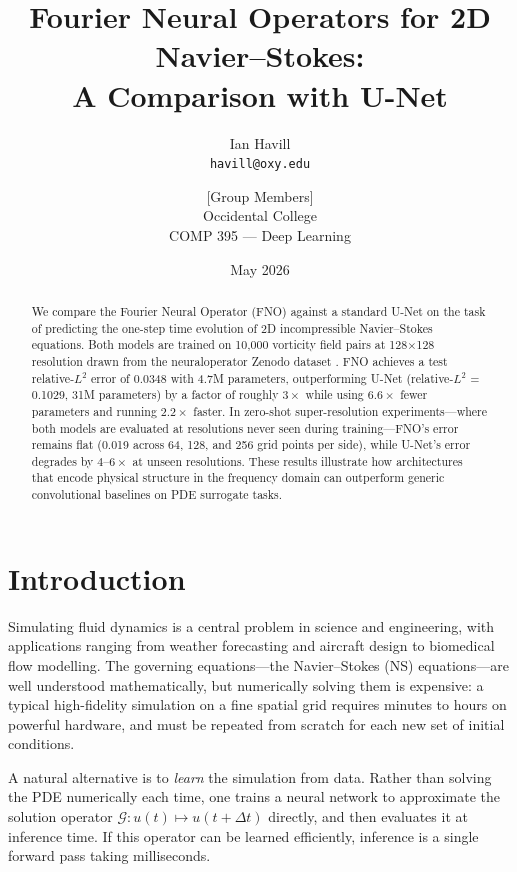 \documentclass[11pt,twocolumn]{article}
\title{\textbf{Fourier Neural Operators for 2D Navier--Stokes:\\
       A Comparison with U-Net}}
\author{
  Ian Havill\\
  \texttt{havill@oxy.edu}
  \and
  [Group Members]\\
  Occidental College\\
  COMP 395 --- Deep Learning
}
\date{May 2026}
\begin{document}
\maketitle

\begin{abstract}
We compare the Fourier Neural Operator (FNO) \cite{li2021fno} against a standard
U-Net \cite{ronneberger2015unet} on the task of predicting the one-step time
evolution of 2D incompressible Navier--Stokes equations.
Both models are trained on 10{,}000 vorticity field pairs at 128$\times$128
resolution drawn from the neuraloperator Zenodo dataset \cite{zenodo2024}.
FNO achieves a test relative-$L^2$ error of 0.0348 with 4.7M parameters,
outperforming U-Net (relative-$L^2$ = 0.1029, 31M parameters) by a factor of
roughly $3\times$ while using $6.6\times$ fewer parameters and running $2.2\times$
faster.
In zero-shot super-resolution experiments---where both models are evaluated at
resolutions never seen during training---FNO's error remains flat (0.019 across
64, 128, and 256 grid points per side), while U-Net's error degrades by
$4$--$6\times$ at unseen resolutions.
These results illustrate how architectures that encode physical structure in the
frequency domain can outperform generic convolutional baselines on PDE surrogate
tasks.
\end{abstract}

\section{Introduction}
\label{sec:intro}

Simulating fluid dynamics is a central problem in science and engineering, with
applications ranging from weather forecasting and aircraft design to biomedical
flow modelling.
The governing equations---the Navier--Stokes (NS) equations---are well understood
mathematically, but numerically solving them is expensive: a typical high-fidelity
simulation on a fine spatial grid requires minutes to hours on powerful hardware,
and must be repeated from scratch for each new set of initial conditions.

A natural alternative is to \emph{learn} the simulation from data.
Rather than solving the PDE numerically each time, one trains a neural network to
approximate the solution operator $\mathcal{G}: u(t) \mapsto u(t + \Delta t)$
directly, and then evaluates it at inference time.
If this operator can be learned efficiently, inference is a single forward pass
taking milliseconds.
\end{document}

